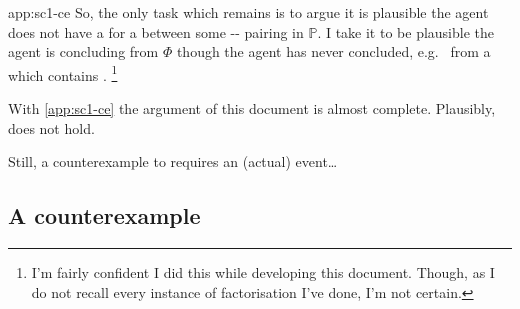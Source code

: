 \begin{note}
\begin{dets}{app:sc1-ce}
  So, the only task which remains is to argue it is plausible the agent does not have a \wit{} for a \fingfr{} between some -- pairing in \(\mathbb{P}\).
  I take it to be plausible the agent is concluding  from \(\Phi\) though the agent has never concluded, e.g.\  from a \pool{} which contains .%
  \footnote{
    I'm fairly confident I did this while developing this document.
    Though, as I do not recall every instance of factorisation I've done, I'm not certain.
  }
  \end{dets}
\end{note}


\begin{note}
  With \autoref{app:sc1-ce} the argument of this document is almost complete.
  Plausibly, \issueInclusion{} does not hold.

  Still, a counterexample to \issueInclusion{} requires an (actual) event\dots
\end{note}





\subsection{A counterexample}
\label{sec:counterexample}



